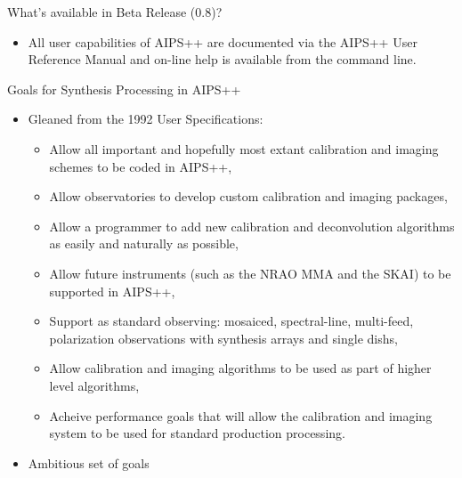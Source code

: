 \begin{slide}{What's available in Beta Release (0.8)?}
\begin{itemize}
\begin{itemize}
\item Flexible windowing in the deconvolution,
\item Non-Negative Least Squares Deconvolution,
\item Flexible construction of models for self-calibration,
\item A sophisticated multi-component model for gain effects,
\item Interactive editing,
\item Flagging of gain solutions by antenna, spectral window, and
time interval.
\item Writing of final images to FITS files.
\end{itemize}
\item All user capabilities of AIPS++ are documented via the
AIPS++ User Reference Manual
and on-line help is available from the command line.
\end{itemize}
\end{slide}

\begin{slide}{Goals for Synthesis Processing in AIPS++}
\begin{itemize}
\item Gleaned from the 1992 User Specifications:
\begin{itemize}
\item Allow all important and hopefully most extant calibration and imaging
schemes to be coded in AIPS++,
\item Allow observatories to develop custom calibration and imaging
packages,
\item Allow a programmer to add new calibration and deconvolution algorithms
as easily and naturally as possible,
\item Allow future instruments (such as the NRAO MMA and the SKAI) to be 
supported in AIPS++,
\item Support as standard observing: mosaiced, spectral-line, multi-feed, 
polarization observations with synthesis arrays and single dishs,
\item Allow calibration and imaging algorithms to be used as
part of higher level algorithms,
\item Acheive performance goals that will allow the calibration and
imaging system to be used for standard production processing.
\end{itemize}
\item Ambitious set of goals
\end{itemize}
\end{slide}

